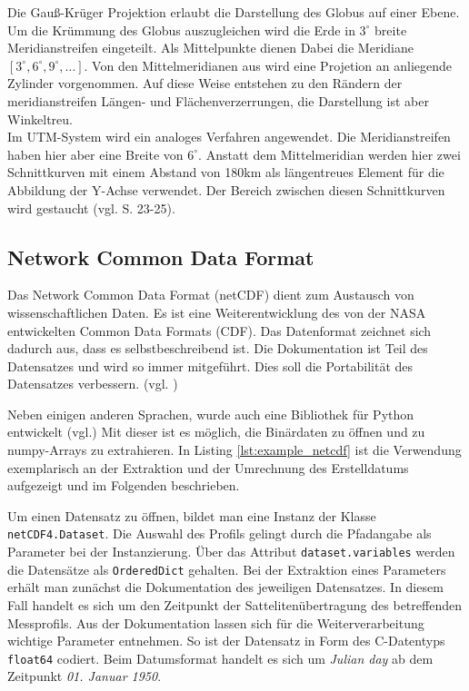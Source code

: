 Die Gauß-Krüger Projektion erlaubt die Darstellung des Globus auf einer Ebene. Um die Krümmung des Globus auszugleichen wird die Erde in $3^\circ$ breite Meridianstreifen eingeteilt. Als Mittelpunkte dienen Dabei die Meridiane $[ 3^\circ, 6^\circ, 9^\circ, \dots]$. Von den Mittelmeridianen aus wird eine Projetion an anliegende Zylinder vorgenommen. Auf diese Weise entstehen zu den Rändern der meridianstreifen Längen- und Flächenverzerrungen, die Darstellung ist aber Winkeltreu.
\\

Im UTM-System wird ein analoges Verfahren angewendet. Die Meridianstreifen haben hier aber eine Breite von $6^\circ$. Anstatt dem Mittelmeridian werden hier zwei Schnittkurven mit einem Abstand von 180km als längentreues Element für die Abbildung der Y-Achse verwendet. Der Bereich zwischen diesen Schnittkurven wird gestaucht (vgl. \cite{witte2011vermessungskunde} S. 23-25).



    \subsection{Network Common Data Format}

    Das Network Common Data Format (netCDF) dient zum Austausch von wissenschaftlichen Daten. Es ist eine Weiterentwicklung des von der NASA entwickelten Common Data Formats (CDF). Das Datenformat zeichnet sich dadurch aus, dass es selbstbeschreibend ist. Die Dokumentation ist Teil des Datensatzes und wird so immer  mitgeführt. Dies soll die Portabilität des Datensatzes verbessern.  (vgl. \cite{FisherNetCDF})

    Neben einigen anderen Sprachen, wurde auch eine Bibliothek für Python entwickelt (vgl.\cite{netCDF4}) Mit dieser ist es möglich, die Binärdaten zu öffnen und zu numpy-Arrays zu extrahieren. In Listing \ref{lst:example_netcdf} ist die Verwendung exemplarisch an der Extraktion und der Umrechnung des Erstelldatums  aufgezeigt und im Folgenden beschrieben.


    Um einen Datensatz zu öffnen, bildet man eine Instanz der Klasse \texttt{netCDF4.Dataset}. Die Auswahl des Profils gelingt durch die Pfadangabe als Parameter bei der Instanzierung.
    Über das Attribut \texttt{dataset.variables} werden die Datensätze als \texttt{OrderedDict} gehalten. Bei der Extraktion eines Parameters erhält man zunächst die Dokumentation des jeweiligen Datensatzes. In diesem Fall handelt es sich um den Zeitpunkt der Sattelitenübertragung des betreffenden Messprofils.
    Aus der Dokumentation lassen sich für die Weiterverarbeitung wichtige Parameter entnehmen.
    So ist der Datensatz in Form des C-Datentyps \texttt{float64} codiert. Beim Datumsformat handelt es sich um \textit{Julian day} ab dem Zeitpunkt \textit{01. Januar 1950}.

